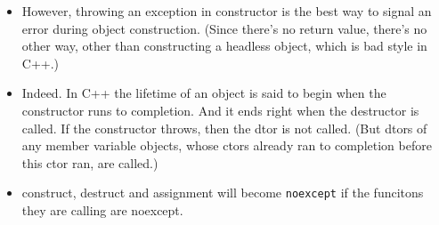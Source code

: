 \documentclass[a4paper,11pt,twoside]{book}
\begin{document}
\begin{itemize}
	\item However, throwing an exception in constructor is the best way to signal an error during object construction. (Since there's no return value, there's no other way, other than constructing a headless object, which is bad style in C++.)
	
	\item Indeed. In C++ the lifetime of an object is said to begin when the constructor runs to completion. And it ends right when the destructor is called. If the constructor throws, then the dtor is not called. (But dtors of any member variable objects, whose ctors already ran to completion before this ctor ran, are called.)
	
	\item construct, destruct and assignment will become \texttt{noexcept} if the funcitons they are calling are noexcept. 
	
\end{itemize}
\end{document}
